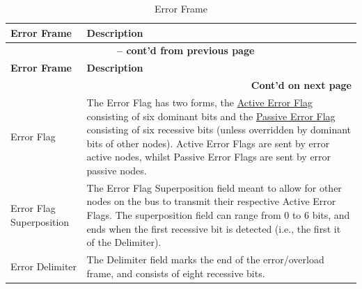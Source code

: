 \begin{longtable}[c]{|p{4cm}|p{11cm}|} 
    
  \caption{Error Frame}
  \label{tab:twai-error-frame} 
  \\\hline
  \rowcolor{lightgray}
  \textbf{Error Frame} & \textbf{Description}
  \\\hline
  \endfirsthead
  
  \multicolumn{2}{c}{\bfseries \tablename\ \thetable{} -- cont'd from previous page}\\  \hline
  
  \rowcolor{lightgray}
    \textbf{Error Frame} & \textbf{Description}
  \\\hline
  \endhead
  
  \multicolumn{2}{r}{\textbf{Cont'd on next page}} \\
  \endfoot
  \endlastfoot

    Error Flag & The Error Flag has two forms, the \hyperref[table_item:active_err]{Active Error Flag} consisting of six dominant bits and the \hyperref[table_item:passive_err]{Passive Error Flag} consisting of six recessive bits (unless overridden by dominant bits of other nodes). Active Error Flags are sent by error active nodes, whilst Passive Error Flags are sent by error passive nodes.
          \\\hline
    Error Flag Superposition & The Error Flag Superposition field meant to allow for other nodes on the bus to transmit their respective Active Error Flags. The superposition field can range from 0 to 6 bits, and ends when the first recessive bit is detected (i.e., the first it of the Delimiter).           \\\hline
    Error Delimiter & The Delimiter field marks the end of the error/overload frame, and consists of eight recessive bits.                                                  
          \\\hline
\end{longtable}
